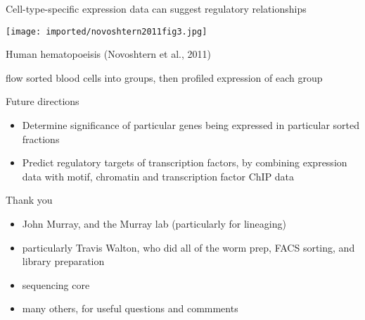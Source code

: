 \documentclass[serif,9pt]{beamer}
\begin{document}
\begin{frame}{Cell-type-specific expression data can suggest regulatory relationships}

\texttt{[image: imported/novoshtern2011fig3.jpg]}

Human hematopoeisis (Novoshtern et al., 2011)

{\small flow sorted blood cells into groups, then profiled expression of each group}

\end{frame}

\begin{frame}{Future directions}

\begin{itemize}

\item Determine significance of particular genes being expressed in particular
sorted fractions

\item Predict regulatory targets of transcription factors, by combining
expression data with motif, chromatin and transcription factor ChIP data

\end{itemize}

\end{frame}

\begin{frame}{Thank you}

\begin{itemize}

\item John Murray, and the Murray lab (particularly for lineaging)

\item particularly Travis Walton, who did all of the worm prep, FACS sorting,
and library preparation

\item sequencing core

\item many others, for useful questions and commments

\end{itemize}

\end{frame}
\end{document}
